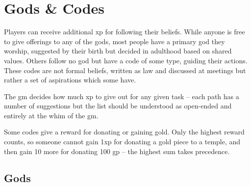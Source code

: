 \chapter{Gods \& Codes}
\label{gods_codes}

\begin{multicols}{2}

\noindent
Players can receive additional \gls{xp} for following their beliefs.
While anyone is free to give offerings to any of the gods, most people have a primary god they worship, suggested by their birth but decided in adulthood based on shared values.
Others follow no god but have a code of some type, guiding their actions.
These codes are not formal beliefs, written as law and discussed at meetings but rather a set of aspirations which some have.

The \gls{gm} decides how much \gls{xp} to give out for any given task -- each path has a number of suggestions but the list should be understood as open-ended and entirely at the whim of the \gls{gm}.

Some codes give a reward for donating or gaining gold.
Only the highest reward counts, so someone cannot gain 1\gls{xp} for donating a gold piece to a temple, and then gain 10 more for donating 100 \gls{gp} -- the highest sum takes precedence.

\end{multicols}

\section{Gods}

